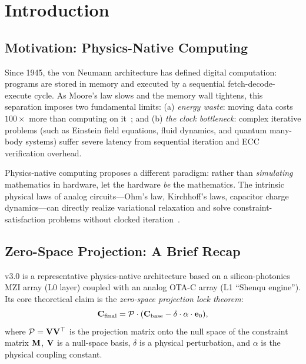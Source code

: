 \section{Introduction}
\label{sec:intro}

\subsection{Motivation: Physics-Native Computing}

Since 1945, the von Neumann architecture has defined digital 
computation: programs are stored in memory and executed by a 
sequential fetch-decode-execute cycle. As Moore's law slows and the 
memory wall tightens, this separation imposes two fundamental limits: 
(a) \emph{energy waste}: moving data costs $100\times$ more than 
computing on it~\cite{horowitz2014computing}; and 
(b) \emph{the clock bottleneck}: complex iterative problems 
(such as Einstein field equations, fluid dynamics, and quantum 
many-body systems) suffer severe latency from sequential iteration 
and ECC verification overhead.

Physics-native computing proposes a different paradigm: rather than 
\emph{simulating} mathematics in hardware, let the hardware 
\emph{be} the mathematics. The intrinsic physical laws of analog 
circuits---Ohm's law, Kirchhoff's laws, capacitor charge dynamics---can 
directly realize variational relaxation and solve constraint-satisfaction 
problems without clocked iteration~\cite{adamatzky2019physics}.

\subsection{Zero-Space Projection: A Brief Recap}

\abnqss v3.0 is a representative physics-native architecture based on 
a silicon-photonics MZI array (L0 layer) coupled with an analog OTA-C 
array (L1 ``Shenqu engine''). Its core theoretical claim is the 
\emph{zero-space projection lock theorem}:
\begin{equation}
    \mathbf{C}_{\mathrm{final}} = \mathcal{P} \cdot (\mathbf{C}_{\mathrm{base}} 
    - \delta \cdot \alpha \cdot \mathbf{e}_0),
    \label{eq:projection}
\end{equation}
where $\mathcal{P} = \mathbf{V} \mathbf{V}^\top$ is the projection matrix onto the 
null space of the constraint matrix $\mathbf{M}$, $\mathbf{V}$ is a null-space 
basis, $\delta$ is a physical perturbation, and $\alpha$ is the 
physical coupling constant.

